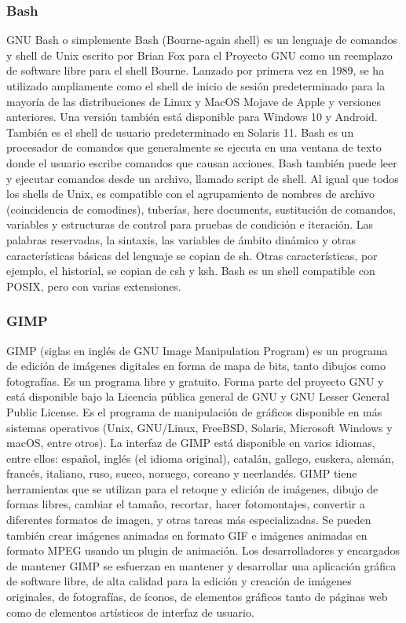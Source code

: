 \subsubsection{Bash}
GNU Bash o simplemente Bash (Bourne-again shell) es un lenguaje de comandos y shell de Unix escrito por Brian Fox para el Proyecto GNU como un reemplazo de software libre para el shell Bourne. Lanzado por primera vez en 1989, se ha utilizado ampliamente como el shell de inicio de sesión predeterminado para la mayoría de las distribuciones de Linux y MacOS Mojave de Apple y versiones anteriores. Una versión también está disponible para Windows 10 y Android. También es el shell de usuario predeterminado en Solaris 11.
Bash es un procesador de comandos que generalmente se ejecuta en una ventana de texto donde el usuario escribe comandos que causan acciones. Bash también puede leer y ejecutar comandos desde un archivo, llamado script de shell. Al igual que todos los shells de Unix, es compatible con el agrupamiento de nombres de archivo (coincidencia de comodines), tuberías, here documents, sustitución de comandos, variables y estructuras de control para pruebas de condición e iteración. Las palabras reservadas, la sintaxis, las variables de ámbito dinámico y otras características básicas del lenguaje se copian de sh. Otras características, por ejemplo, el historial, se copian de csh y ksh. Bash es un shell compatible con POSIX, pero con varias extensiones.

\subsubsection{GIMP}
GIMP (siglas en inglés de GNU Image Manipulation Program) es un programa de edición de imágenes digitales en forma de mapa de bits, tanto dibujos como fotografías. Es un programa libre y gratuito. Forma parte del proyecto GNU y está disponible bajo la Licencia pública general de GNU y GNU Lesser General Public License.
Es el programa de manipulación de gráficos disponible en más sistemas operativos (Unix, GNU/Linux, FreeBSD, Solaris, Microsoft Windows y macOS, entre otros).
La interfaz de GIMP está disponible en varios idiomas, entre ellos: español, inglés (el idioma original), catalán, gallego, euskera, alemán, francés, italiano, ruso, sueco, noruego, coreano y neerlandés.
GIMP tiene herramientas que se utilizan para el retoque y edición de imágenes, dibujo de formas libres, cambiar el tamaño, recortar, hacer fotomontajes, convertir a diferentes formatos de imagen, y otras tareas más especializadas. Se pueden también crear imágenes animadas en formato GIF e imágenes animadas en formato MPEG usando un plugin de animación.
Los desarrolladores y encargados de mantener GIMP se esfuerzan en mantener y desarrollar una aplicación gráfica de software libre, de alta calidad para la edición y creación de imágenes originales, de fotografías, de íconos, de elementos gráficos tanto de páginas web como de elementos artísticos de interfaz de usuario.


